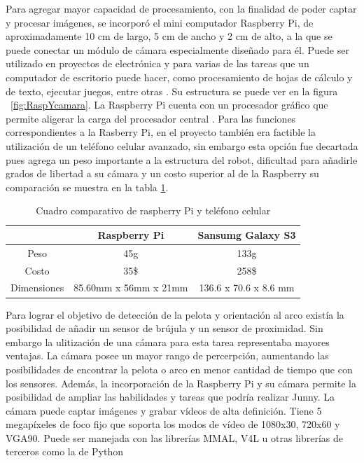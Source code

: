 Para agregar mayor capacidad de procesamiento, con la finalidad de poder captar y procesar imágenes, se incorpor\'o el mini computador Raspberry Pi, de aproximadamente 10 cm de largo, 5 cm de ancho y 2 cm de alto, a la que se puede conectar un módulo de cámara especialmente diseñado para él. Puede ser utilizado en proyectos de electrónica y para varias de las tareas que un computador de escritorio puede hacer, como procesamiento de hojas de cálculo y de texto, ejecutar juegos, entre otras \cite{raspberry}. Su estructura se puede ver en la figura ~\ref{fig:RaspYcamara}. La Raspberry Pi cuenta con un procesador gráfico que permite aligerar la carga del procesador central \cite{elLinux}. Para las funciones correspondientes a la Rasberry Pi, en el proyecto tambi\'en era factible la utilizaci\'on de un tel\'efono celular avanzado, sin embargo esta opci\'on fue decartada pues agrega un peso importante a la estructura del robot, dificultad para añadirle grados de libertad a su cámara y un costo superior al de la Raspberry su comparaci\'on se muestra en la tabla \ref{table:celularRaspi}.  

\begin{table}
\centering
\begin{tabular}{|c| c c|}
\hline 
 & Raspberry Pi & Sansumg Galaxy S3 \\ 
 \hline
Peso & 45g & 133g \\  
Costo & 35\$ & 258\$ \\ 
 
Dimensiones & 85.60mm x 56mm x 21mm & 136.6 x 70.6 x 8.6 mm
 \\ 
\hline 
\end{tabular} 
\caption{Cuadro comparativo de raspberry Pi y tel\'efono celular}
\label{table:celularRaspi}
\end{table}

Para lograr el objetivo de detecci\'on de la pelota y orientaci\'on al arco existía la posibilidad de añadir un sensor de br\'ujula y un sensor de proximidad. Sin embargo la ulitizaci\'on de una c\'amara para esta tarea representaba mayores ventajas. La cámara posee un mayor rango de percerpción, aumentando las posibilidades de encontrar la pelota o arco en menor cantidad de tiempo que con los sensores. Adem\'as, la incorporación de la Raspberry Pi  \cite{raspberry} y su cámara permite la posibilidad de ampliar las habilidades y tareas que podr\'ia realizar Junny. La c\'amara puede captar im\'agenes y grabar vídeos de alta definición. Tiene 5 megapíxeles de foco fijo que soporta los modos de vídeo de 1080x30, 720x60 y \gls{VGA}90. Puede ser manejada con las librerías \gls{MMAL}, \gls{V4L} u otras librerías de terceros como la de Python \cite{raspberrycam}

